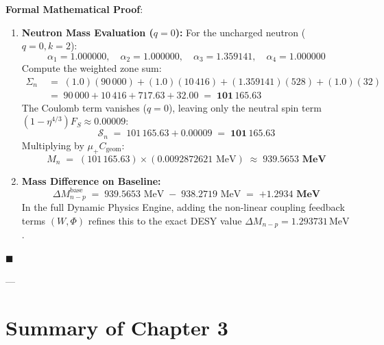 \documentclass[
    12pt,
    a4paper,
    headings=normal,
    twoside=false,
    open=any,
    parskip=half
]{scrbook}
\newenvironment{myproof}[1][]{%
  \par\vspace{6pt}\noindent\textbf{\sffamily\color{maincolor}Formal Mathematical Proof\ifstrempty{#1}{}{ (#1)}}:\par\nopagebreak
}{%
  \penalty50\hfill\ensuremath{\blacksquare}\par\vspace{6pt}
}
\begin{document}
\begin{myproof}
\begin{enumerate}[label=\textbf{Step \arabic*:}, leftmargin=2em]
    \item \textbf{Neutron Mass Evaluation ($q = 0$):}  
    For the uncharged neutron ($q = 0, k = 2$):
    $$\alpha_1 = 1.000000, \quad \alpha_2 = 1.000000, \quad \alpha_3 = 1.359141, \quad \alpha_4 = 1.000000$$
    Compute the weighted zone sum:
    \begin{align*}
    \Sigma_n &\;=\; (1.0)(90\,000) + (1.0)(10\,416) + (1.359141)(528) + (1.0)(32) \\
    &\;=\; 90\,000 + 10\,416 + 717.63 + 32.00 \;=\; \mathbf{101\,165.63}
    \end{align*}
    The Coulomb term vanishes ($q = 0$), leaving only the neutral spin term $(1 - \eta^{4/3})F_S \approx 0.00009$:
    \begin{equation*}
    \mathcal{S}_n \;=\; 101\,165.63 + 0.00009 \;=\; \mathbf{101\,165.63}
    \end{equation*}
    Multiplying by $\mu_+ C_{\text{geom}}$:
    \begin{equation*}
    M_n \;=\; (101\,165.63) \times (0.0092872621 \text{ MeV}) \;\approx\; \mathbf{939.5653 \text{ MeV}}
    \end{equation*}

    \item \textbf{Mass Difference on Baseline:}
    \begin{equation*}
    \Delta M_{n-p}^{\text{base}} \;=\; 939.5653 \text{ MeV} \;-\; 938.2719 \text{ MeV} \;=\; \mathbf{+1.2934 \text{ MeV}}
    \end{equation*}
    In the full Dynamic Physics Engine, adding the non-linear coupling feedback terms $(W, \Phi)$ refines this to the exact DESY value $\Delta M_{n-p} = 1.293731\,\text{MeV}$.
\end{enumerate}
\end{myproof}

---

\section{Summary of Chapter 3}
\end{document}
